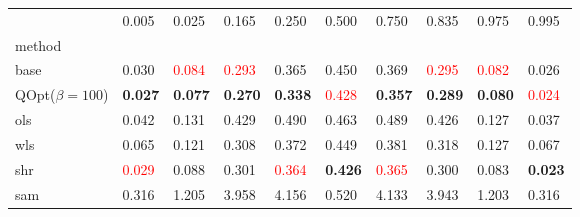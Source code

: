 \begin{tabular}{llllllllll}
\toprule
 & 0.005 & 0.025 & 0.165 & 0.250 & 0.500 & 0.750 & 0.835 & 0.975 & 0.995 \\
method &  &  &  &  &  &  &  &  &  \\
\midrule
base & 0.030 & \textcolor{red}{0.084} & \textcolor{red}{0.293} & 0.365 & 0.450 & 0.369 & \textcolor{red}{0.295} & \textcolor{red}{0.082} & 0.026 \\
\midrule
QOpt($\beta=100$) & \textbf{0.027} & \textbf{0.077} & \textbf{0.270} & \textbf{0.338} & \textcolor{red}{0.428} & \textbf{0.357} & \textbf{0.289} & \textbf{0.080} & \textcolor{red}{0.024} \\
ols & 0.042 & 0.131 & 0.429 & 0.490 & 0.463 & 0.489 & 0.426 & 0.127 & 0.037 \\
wls & 0.065 & 0.121 & 0.308 & 0.372 & 0.449 & 0.381 & 0.318 & 0.127 & 0.067 \\
shr & \textcolor{red}{0.029} & 0.088 & 0.301 & \textcolor{red}{0.364} & \textbf{0.426} & \textcolor{red}{0.365} & 0.300 & 0.083 & \textbf{0.023} \\
sam & 0.316 & 1.205 & 3.958 & 4.156 & 0.520 & 4.133 & 3.943 & 1.203 & 0.316 \\
\bottomrule
\end{tabular}